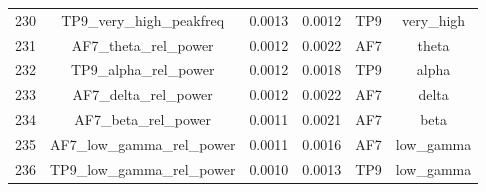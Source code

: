 \begin{table}[hptb]
\begin{table}
\begin{tabular}{cccccc}
230 & TP9_very_high_peakfreq & 0.0013 & 0.0012 & TP9 & very_high \\
231 & AF7_theta_rel_power & 0.0012 & 0.0022 & AF7 & theta \\
232 & TP9_alpha_rel_power & 0.0012 & 0.0018 & TP9 & alpha \\
233 & AF7_delta_rel_power & 0.0012 & 0.0022 & AF7 & delta \\
234 & AF7_beta_rel_power & 0.0011 & 0.0021 & AF7 & beta \\
235 & AF7_low_gamma_rel_power & 0.0011 & 0.0016 & AF7 & low_gamma \\
236 & TP9_low_gamma_rel_power & 0.0010 & 0.0013 & TP9 & low_gamma \\
\bottomrule
\end{tabular}
\end{table}
\end{table}
